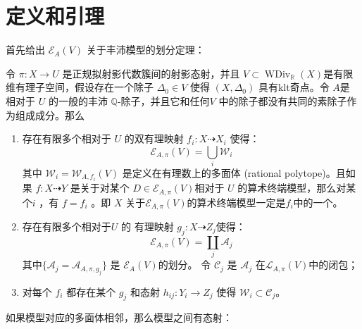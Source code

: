 \section{定义和引理}
首先给出 $\mathcal{E}_{A}(V)$ 关于丰沛模型的划分定理：
\begin{theorem}\label{finitemodel}
  \cite[Corollary 1.1.5]{BCHM10} 令 $\pi:X\to U$ 是正规拟射影代数簇间的射影态射，并且 $V \subset \operatorname{WDiv}_{\mathbb{R}}(X)$是有限维有理子空间，假设存在一个除子 $\Delta_{0} \in V$ 使得 $(X,\Delta_{0})$ 具有klt奇点。令 $A$是 相对于 $U$ 的一般的丰沛 $\mathbb{Q}$-除子，并且它和任何$V$ 中的除子都没有共同的素除子作为组成成分。那么
  \begin{enumerate}
    \item   存在有限多个相对于 $U$ 的双有理映射  $f_{i}:X \dashrightarrow   X_{i}$ 使得：
          \[ \mathcal{E}_{A,\pi}(V) =\bigcup_{i}\mathcal{W}_{i} \]
          其中  $\mathcal{W}_{i}=\mathcal{W}_{A,f_{i}}(V)$ 是定义在有理数上的多面体  (rational polytope)。且如果  $f:X \dashrightarrow  Y$ 是关于对某个 $D \in \mathcal{E}_{A,\pi}(V)$相对于 $U$ 的算术终端模型，那么对某个$i$ ，有  $f=f_{i}$ 。即 $X$ 关于$\mathcal{E}_{A,\pi}(V)$的算术终端模型一定是$f_{i}$中的一个。   
    \item   存在有限多个相对于$U$ 的 有理映射 $g_{j}:X \dashrightarrow  Z_{j}$使得： 
          \[ \mathcal{E}_{A,\pi}(V) =\coprod_{j}\mathcal{A}_{j} \]
          其中$ \{\mathcal{A}_j=\mathcal{A}_{A,\pi,g_j}\} $ 是 $ \mathcal{E}_{A}(V) $的划分。 令 $\mathcal{C}_{j}$ 是 $\mathcal{A}_{j}$ 在$\mathcal{L}_{A,\pi}(V)$中的闭包；
    \item  对每个  $f_{i}$ 都存在某个 $g_{j}$ 和态射 $h_{ij}:Y_{i}\to Z_{j}$ 使得 $\mathcal{W}_{i} \subset \mathcal{C}_{j}$。
  \end{enumerate}
\end{theorem}
如果模型对应的多面体相邻，那么模型之间有态射：
